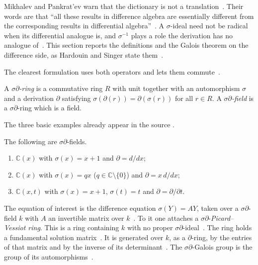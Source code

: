 Mikhalev and Pankrat'ev warn that the dictionary is not a
translation~\cite[p.~912]{MikhalevPankratev1989}. Their words are that ``all
these results in difference algebra are essentially different from the
corresponding results in differential
algebra''~\cite[p.~912]{MikhalevPankratev1989}. A $\sigma$-ideal need not be
radical when its differential analogue is, and $\sigma^{-1}$ plays a role the
derivation has no analogue of~\cite[p.~912]{MikhalevPankratev1989}. This
section reports the definitions and the Galois theorem on the difference side,
as Hardouin and Singer state them~\cite[pp.~5--6]{HardouinSinger2008}.

The clearest formulation uses both operators and lets them
commute~\cite[Definition~2.1, p.~5]{HardouinSinger2008}.

\begin{definition}\label{def:diffalg:sigma-delta-ring}
A \emph{$\sigma\partial$-ring} is a commutative ring $R$ with unit
together with an automorphism $\sigma$ and a derivation $\partial$
satisfying $\sigma(\partial(r)) = \partial(\sigma(r))$ for all
$r \in R$. A \emph{$\sigma\partial$-field} is a $\sigma\partial$-ring
which is a field.
\end{definition}

The three basic examples already appear in the source
\cite[Example~2.2, p.~5]{HardouinSinger2008}.

\begin{example}\label{ex:diffalg:sigma-delta-examples}
The following are $\sigma\partial$-fields.
\begin{enumerate}
\item $\mathbb{C}(x)$ with $\sigma(x) = x+1$ and $\partial = d/dx$;
\item $\mathbb{C}(x)$ with $\sigma(x) = qx$ ($q\in\mathbb{C}\setminus\{0\}$)
  and $\partial = x\,d/dx$;
\item $\mathbb{C}(x,t)$ with $\sigma(x) = x+1$, $\sigma(t)=t$ and
  $\partial = \partial/\partial t$.
\end{enumerate}
\end{example}

The equation of interest is the difference equation $\sigma(Y) = AY$, taken
over a $\sigma\partial$-field $k$ with $A$ an invertible matrix over
$k$~\cite[pp.~5--6]{HardouinSinger2008}. To it one attaches a
$\sigma\partial$-\emph{Picard--Vessiot ring}. This is a ring containing $k$
with no proper $\sigma\partial$-ideal~\cite[Definition~2.3, p.~5]{HardouinSinger2008}.
The ring holds a fundamental solution
matrix~\cite[Definition~2.3, p.~5]{HardouinSinger2008}. It is generated over
$k$, as a
$\partial$-ring, by the entries of that matrix and by the inverse of its
determinant~\cite[Definition~2.3, p.~5]{HardouinSinger2008}. The
$\sigma\partial$-Galois group is the group of its
automorphisms~\cite[Definition~2.5, p.~6]{HardouinSinger2008}.

